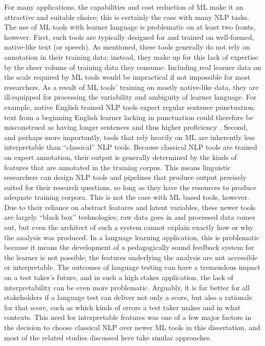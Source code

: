 For many applications, the capabilities and cost reduction of ML make it an attractive and suitable choice; this is certainly the case with many NLP tasks. The use of ML tools with learner language is problematic on at least two fronts, however. First, such tools are typically designed for and trained on well-formed, native-like text (or speech). As mentioned, these tools generally do not rely on annotation in their training data; instead, they make up for this lack of expertise by the sheer volume of training data they consume. Including real learner data on the scale required by ML tools would be impractical if not impossible for most researchers. As a result of ML tools' training on mostly native-like data, they are ill-equipped for processing the variability and ambiguity of learner language. For example, native English trained NLP tools expect regular sentence punctuation; text from a beginning English learner lacking in punctuation could therefore be misconstrued as having longer sentences and thus higher proficiency \cite{MeurersDickinson2017}. Second, and perhaps more importantly, tools that rely heavily on ML are inherently less interpretable than ``classical'' NLP tools. Because classical NLP tools are trained on expert annotation, their output is generally determined by the kinds of features that are annotated in the training corpus. This means linguistic researchers can design NLP tools and pipelines that produce output precisely suited for their research questions, so long as they have the resources to produce adequate training corpora. This is not the case with ML based tools, however. Due to their reliance on abstract features and latent variables, these newer tools are largely ``black box'' technologies; raw data goes in and processed data comes out, but even the architect of such a system cannot explain exactly how or why the analysis was produced. In a language learning application, this is problematic because it means the development of a pedagogically sound feedback system for the learner is not possible; the features underlying the analysis are not accessible or interpretable. The outcomes of language testing can have a tremendous impact on a test taker's future, and in such a high stakes application, the lack of interpretability can be even more problematic. Arguably, it is far better for all stakeholders if a language test can deliver not only a score, but also a rationale for that score, such as which kinds of errors a test taker makes and in what contexts. This need for interpretable features was one of a few major factors in the decision to choose classical NLP over newer ML tools in this dissertation, and most of the related studies discussed here take similar approaches.

